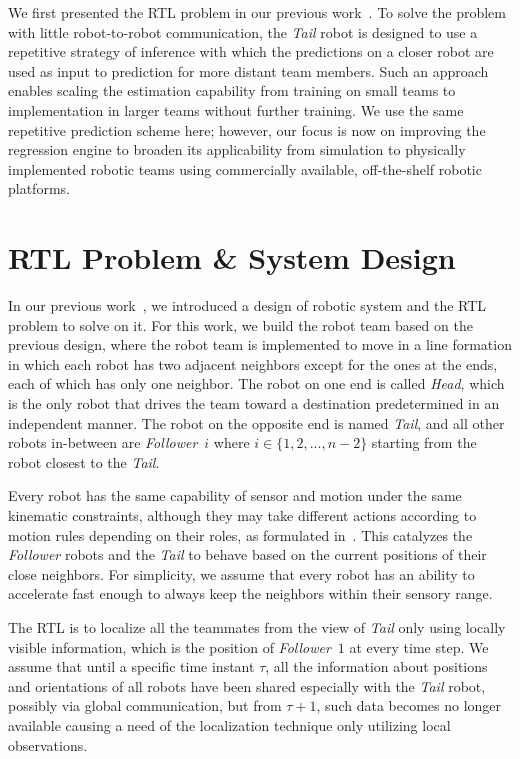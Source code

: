 \documentclass[letterpaper, 10 pt, conference]{ieeeconf}  %
\begin{document}
    We first presented the RTL problem in our previous
    work~\cite{CPR17}. To solve the problem with little robot-to-robot
    communication, the \emph{Tail} robot is designed to use a repetitive
    strategy of inference with which the predictions on a closer robot
    are used as input to prediction for more distant team members. Such
    an approach enables scaling the estimation capability from training
    on small teams to implementation in larger teams without further
    training. We use the same repetitive prediction scheme here;
    however, our focus is now on improving the regression engine to
    broaden its applicability from simulation to physically implemented
    robotic teams using commercially available, off-the-shelf robotic
    platforms.

	\section{RTL Problem \& System Design}
	\label{sec:rtl_problem}

	In our previous work~\cite{CPR17}, we introduced a design of robotic system and the RTL
	problem to solve on it.
	For this work, we build the robot team based on the previous design, where
	the robot team is implemented to move in a line formation
	in which each robot has two adjacent neighbors except for the ones at the ends,
	each of which has only one neighbor.
	The robot on one end is called \emph{Head}, which is the only robot that
	drives the team toward a destination predetermined in an independent manner.
	The robot on the opposite end is named \emph{Tail}, and all other robots
	in-between are \emph{Follower}~$i$ where $i \in \{1, 2, ..., n-2\}$ starting
	from the robot closest to the \emph{Tail}.

	Every robot has the same capability of sensor and motion under the same
	kinematic constraints, although they may take different actions according to
	motion rules depending on their roles, as formulated in~\cite{CPR17}. This catalyzes the
	 \emph{Follower} robots and the \emph{Tail} to behave based on the current positions of their close neighbors. For simplicity, we assume that every robot
	 has an ability to accelerate fast enough to always keep the neighbors within their
	 sensory range.

	The RTL is to localize all the teammates from the view of
	\emph{Tail} only using locally visible information, which is the position of
	\emph{Follower}~$1$ at every time step.
	We assume that until a specific time instant
	$\tau$, all the information about positions and orientations of all robots
	have been shared especially with the \emph{Tail} robot,
	possibly via global communication,
	but from $\tau+1$, such data becomes no longer available causing a need of the
	localization technique only utilizing local observations.
\end{document}
